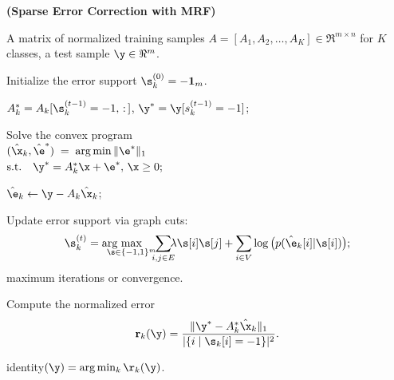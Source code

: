 \begin{algorithm}[h]
\caption{{\bf (Sparse Error Correction with MRF)}} \label{alg:p-mrf}
\begin{algorithmic}[1]
 A matrix of normalized training samples $A =
[A_1,A_2,\ldots,A_K] \in \Re^{m\times n}$ for $K$ classes, a test
sample $\y \in \Re^{m}$.


\STATE Initialize the error support $\s^{(0)}_k = \mathbf{-1}_m$.


\STATE \hspace{3mm}$A_k^* = A_k[\s^{(t-1)}_k=-1,\, :\, ]$, $\y^* =
\y[s^{(t-1)}_k=-1]$;

\STATE \hspace{3mm}Solve the convex program\\
\hspace{5mm} $(\hat{\x}_k,\hat{\e}^*) \;=\; \arg\min \|\e^*\|_1 $\\
\hspace{24mm} $\mathrm{ s.t. } \quad \y^* = A_k^*\x+\e^*, \, \x\geq 0;$

\STATE \hspace{3mm}$\hat{\e}_k\leftarrow \y-A_k\hat{\x}_k$;

\STATE \hspace{3mm}Update error support via graph cuts:\vspace{0mm}
$$\s^{(t)}_k = \arg\hspace{-4mm}\max_{\s\in\{-1,1\}^m}\hspace{-2mm}\sum_{i,j\in
E}\hspace{-2mm}{\lambda} \s[i]\s[j]+\sum_{i\in
V}\log\big(p(\hat{\e}_k[i]|\s[i])\big);$$\vspace{0mm}
 maximum iterations or convergence.

\STATE Compute the normalized error $$\mathbf{r}_k(\y) =
\frac{\|\y^*-A_k^*\hat{\x}_k\|_1}{|\{ i \mid \s_k[i] = -1 \}|^2}. \vspace{0mm}$$
\ENDFOR

 identity$(\y) = \arg\min_k \r_k(\y)$.
\end{algorithmic}
\end{algorithm}

